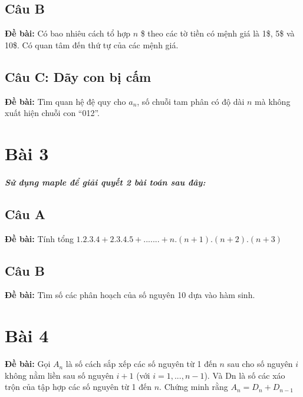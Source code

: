 \documentclass[12pt]{article}
\begin{document}
\begin{sloppypar}
\subsection{Câu B}
\begin{tcolorbox}
    \textbf{Đề bài:} Có bao nhiêu cách tổ hợp \(n\) \$ theo các tờ tiền có mệnh giá là 1\$, 5\$ và 10\$. Có quan tâm đến thứ tự của các mệnh giá.
\end{tcolorbox}

\subsection{Câu C: Dãy con bị cấm}
\begin{tcolorbox}
    \textbf{Đề bài:} Tìm quan hệ đệ quy cho \(a_{n}\), số chuỗi tam phân có độ dài \(n\) mà không xuất hiện chuỗi con “012”.
\end{tcolorbox}

\section{Bài 3}
\subparagraph {Sử dụng maple để giải quyết 2 bài toán sau đây:}

\subsection{Câu A}
\begin{tcolorbox}
    \textbf{Đề bài:} Tính tổng \(1.2.3.4 + 2.3.4.5 + ....... + n.(n+1).(n+2).(n+3)\)
\end{tcolorbox}

\subsection{Câu B}
\begin{tcolorbox}
    \textbf{Đề bài:} Tìm số các phân hoạch của số nguyên 10 dựa vào hàm sinh.
\end{tcolorbox}

\section{Bài 4}
\begin{tcolorbox}
    \textbf{Đề bài:}  Gọi \(A_{n}\) là số cách sắp xếp các số nguyên từ 1 đến \(n\) sau cho số nguyên \(i\) không nằm liền sau số nguyên \(i+1\) 
    (với \(i=1,...,n-1\)). Và Dn là số các xáo trộn của tập hợp các số nguyên từ 1 đến \(n\). Chứng minh rằng \(A_{n}= D_{n} + D_{n-1}\)
\end{tcolorbox}


\end{sloppypar}
\end{document}

